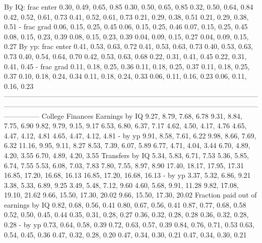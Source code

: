                      By IQ: frac enter       0.30, 0.49, 0.65, 0.85       0.30, 0.50, 0.65, 0.85   0.32, 0.50, 0.64, 0.84    0.42, 0.52, 0.61, 0.73      0.41, 0.52, 0.61, 0.73      0.21, 0.29, 0.38, 0.51      0.21, 0.29, 0.38, 0.51
                           - frac grad       0.06, 0.15, 0.25, 0.45       0.06, 0.15, 0.25, 0.46   0.07, 0.15, 0.25, 0.45    0.08, 0.15, 0.23, 0.39      0.08, 0.15, 0.23, 0.39      0.04, 0.09, 0.15, 0.27      0.04, 0.09, 0.15, 0.27
                     By yp: frac enter       0.41, 0.53, 0.63, 0.72       0.41, 0.53, 0.63, 0.73   0.40, 0.53, 0.63, 0.73    0.40, 0.54, 0.64, 0.70      0.42, 0.53, 0.63, 0.68      0.22, 0.31, 0.41, 0.45      0.22, 0.31, 0.41, 0.45
                           - frac grad       0.11, 0.18, 0.25, 0.36       0.11, 0.18, 0.25, 0.37   0.11, 0.18, 0.25, 0.37    0.10, 0.18, 0.24, 0.34      0.11, 0.18, 0.24, 0.33      0.06, 0.11, 0.16, 0.23      0.06, 0.11, 0.16, 0.23
---------------------------------------------------------------------------------------------------------------------------------------------------------------------------------------------------------------------------------------
                      College Finances                                                                                                                                                                                                 
                        Earnings by IQ       9.27, 8.79, 7.68, 6.78       9.31, 8.84, 7.75, 6.90   9.82, 9.79, 9.15, 9.17    6.53, 6.80, 6.37, 7.17      4.62, 4.50, 4.17, 4.76      4.65, 4.47, 4.12, 4.81      4.65, 4.47, 4.12, 4.81
                               - by yp       9.91, 8.58, 7.61, 6.22       9.98, 8.66, 7.69, 6.32  11.16, 9.95, 9.11, 8.27    8.53, 7.39, 6.07, 5.89      6.77, 4.71, 4.04, 3.44      6.70, 4.89, 4.20, 3.55      6.70, 4.89, 4.20, 3.55
                       Transfers by IQ       5.34, 5.83, 6.71, 7.53       5.36, 5.85, 6.74, 7.55   5.53, 6.08, 7.03, 7.83    7.80, 7.55, 8.97, 8.90  17.40, 18.17, 17.95, 17.31  16.85, 17.20, 16.68, 16.13  16.85, 17.20, 16.68, 16.13
                               - by yp       3.37, 5.32, 6.86, 9.21       3.38, 5.33, 6.89, 9.25   3.49, 5.48, 7.12, 9.60   4.60, 5.68, 9.91, 11.28   9.82, 17.08, 19.10, 21.62   9.66, 15.50, 17.30, 20.02   9.66, 15.50, 17.30, 20.02
   Fraction paid out of earnings by IQ       0.82, 0.68, 0.56, 0.41       0.80, 0.67, 0.56, 0.41   0.87, 0.77, 0.68, 0.58    0.52, 0.50, 0.45, 0.44      0.35, 0.31, 0.28, 0.27      0.36, 0.32, 0.28, 0.28      0.36, 0.32, 0.28, 0.28
                               - by yp       0.73, 0.64, 0.58, 0.39       0.72, 0.63, 0.57, 0.39   0.84, 0.76, 0.71, 0.53    0.63, 0.54, 0.45, 0.36      0.47, 0.32, 0.28, 0.20      0.47, 0.34, 0.30, 0.21      0.47, 0.34, 0.30, 0.21
